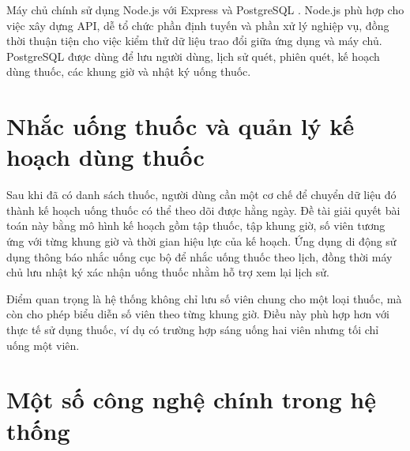 \documentclass[12pt,a4paper]{report}
\begin{document}
Máy chủ chính sử dụng Node.js với Express \cite{express} và PostgreSQL \cite{postgresql}. Node.js phù hợp cho việc xây dựng API, dễ tổ chức phần định tuyến và phần xử lý nghiệp vụ, đồng thời thuận tiện cho việc kiểm thử dữ liệu trao đổi giữa ứng dụng và máy chủ. PostgreSQL được dùng để lưu người dùng, lịch sử quét, phiên quét, kế hoạch dùng thuốc, các khung giờ và nhật ký uống thuốc.

\section{Nhắc uống thuốc và quản lý kế hoạch dùng thuốc}

Sau khi đã có danh sách thuốc, người dùng cần một cơ chế để chuyển dữ liệu đó thành kế hoạch uống thuốc có thể theo dõi được hằng ngày. Đề tài giải quyết bài toán này bằng mô hình kế hoạch gồm tập thuốc, tập khung giờ, số viên tương ứng với từng khung giờ và thời gian hiệu lực của kế hoạch. Ứng dụng di động sử dụng thông báo nhắc uống cục bộ để nhắc uống thuốc theo lịch, đồng thời máy chủ lưu nhật ký xác nhận uống thuốc nhằm hỗ trợ xem lại lịch sử.

Điểm quan trọng là hệ thống không chỉ lưu số viên chung cho một loại thuốc, mà còn cho phép biểu diễn số viên theo từng khung giờ. Điều này phù hợp hơn với thực tế sử dụng thuốc, ví dụ có trường hợp sáng uống hai viên nhưng tối chỉ uống một viên.

\section{Một số công nghệ chính trong hệ thống}
\end{document}
